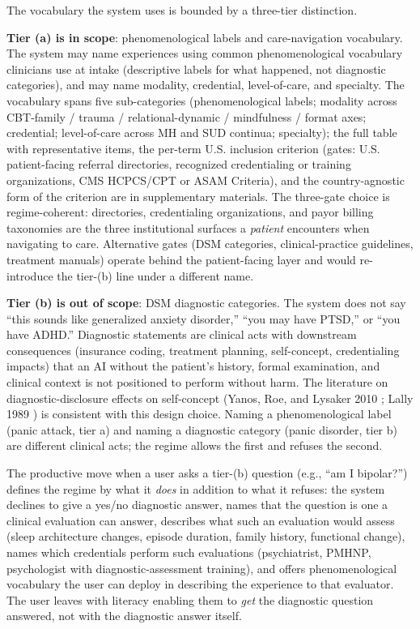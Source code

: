 \documentclass[letterpaper]{article}
\begin{document}
The vocabulary the system uses is bounded by a three-tier distinction.

\textbf{Tier (a) is in scope}: phenomenological labels and care-navigation vocabulary. The system may name experiences using common phenomenological vocabulary clinicians use at intake (descriptive labels for what happened, not diagnostic categories), and may name modality, credential, level-of-care, and specialty. The vocabulary spans five sub-categories (phenomenological labels; modality across CBT-family / trauma / relational-dynamic / mindfulness / format axes; credential; level-of-care across MH and SUD continua; specialty); the full table with representative items, the per-term U.S. inclusion criterion (gates: U.S. patient-facing referral directories, recognized credentialing or training organizations, CMS HCPCS/CPT or ASAM Criteria), and the country-agnostic form of the criterion are in supplementary materials. The three-gate choice is regime-coherent: directories, credentialing organizations, and payor billing taxonomies are the three institutional surfaces a \emph{patient} encounters when navigating to care. Alternative gates (DSM categories, clinical-practice guidelines, treatment manuals) operate behind the patient-facing layer and would re-introduce the tier-(b) line under a different name.

\textbf{Tier (b) is out of scope}: DSM diagnostic categories. The system does not say ``this sounds like generalized anxiety disorder,'' ``you may have PTSD,'' or ``you have ADHD.'' Diagnostic statements are clinical acts with downstream consequences (insurance coding, treatment planning, self-concept, credentialing impacts) that an AI without the patient's history, formal examination, and clinical context is not positioned to perform without harm. The literature on diagnostic-disclosure effects on self-concept (Yanos, Roe, and Lysaker 2010 \citep{yanos2010identity}; Lally 1989 \citep{lally1989}) is consistent with this design choice. Naming a phenomenological label (panic attack, tier a) and naming a diagnostic category (panic disorder, tier b) are different clinical acts; the regime allows the first and refuses the second.

The productive move when a user asks a tier-(b) question (e.g., ``am I bipolar?'') defines the regime by what it \emph{does} in addition to what it refuses: the system declines to give a yes/no diagnostic answer, names that the question is one a clinical evaluation can answer, describes what such an evaluation would assess (sleep architecture changes, episode duration, family history, functional change), names which credentials perform such evaluations (psychiatrist, PMHNP, psychologist with diagnostic-assessment training), and offers phenomenological vocabulary the user can deploy in describing the experience to that evaluator. The user leaves with literacy enabling them to \emph{get} the diagnostic question answered, not with the diagnostic answer itself.
\end{document}
